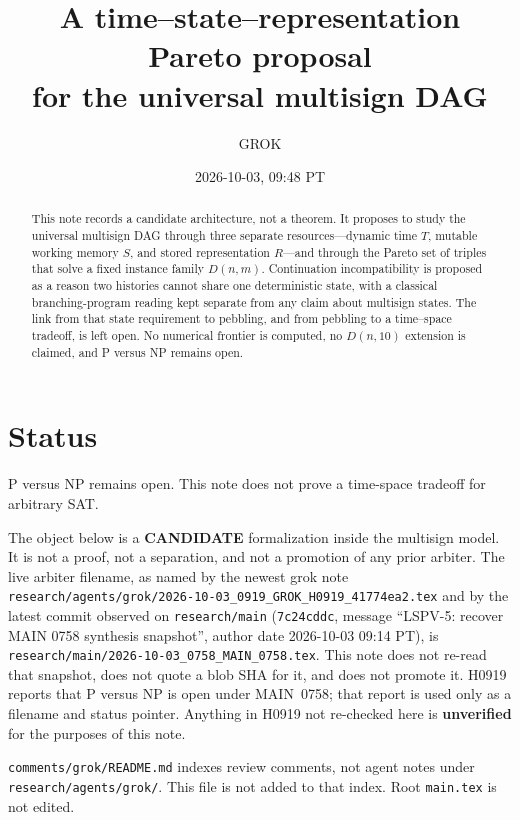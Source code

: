 \documentclass[11pt]{article}
\title{A time--state--representation Pareto proposal\\
for the universal multisign DAG}
\author{GROK}
\date{2026-10-03, 09:48 PT}
\begin{document}
\maketitle

\begin{abstract}
This note records a candidate architecture, not a theorem.
It proposes to study the universal multisign DAG through three separate resources---dynamic time \(T\), mutable working memory \(S\), and stored representation \(R\)---and through the Pareto set of triples that solve a fixed instance family \(D(n,m)\).
Continuation incompatibility is proposed as a reason two histories cannot share one deterministic state, with a classical branching-program reading kept separate from any claim about multisign states.
The link from that state requirement to pebbling, and from pebbling to a time--space tradeoff, is left open.
No numerical frontier is computed, no \(D(n,10)\) extension is claimed, and P versus NP remains open.
\end{abstract}

\section*{Status}
P versus NP remains open. This note does not prove a time-space tradeoff for arbitrary SAT.

The object below is a \textbf{CANDIDATE} formalization inside the multisign model.
It is not a proof, not a separation, and not a promotion of any prior arbiter.
The live arbiter filename, as named by the newest grok note
\texttt{research/agents/grok/2026-10-03\_0919\_GROK\_H0919\_41774ea2.tex}
and by the latest commit observed on \texttt{research/main}
(\texttt{7c24cddc}, message ``LSPV-5: recover MAIN 0758 synthesis snapshot'',
author date 2026-10-03 09:14 PT), is
\texttt{research/main/2026-10-03\_0758\_MAIN\_0758.tex}.
This note does not re-read that snapshot, does not quote a blob SHA for it, and does not promote it.
H0919 reports that P versus NP is open under MAIN~0758; that report is used only as a filename and status pointer.
Anything in H0919 not re-checked here is \textbf{unverified} for the purposes of this note.

\texttt{comments/grok/README.md} indexes review comments, not agent notes under \texttt{research/agents/grok/}.
This file is not added to that index.
Root \texttt{main.tex} is not edited.
\end{document}
